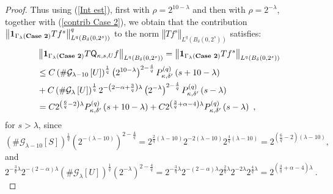 \documentclass{amsart}%
\theoremstyle{plain}
\numberwithin{equation}{section}
\begin{document}
\begin{proof}
Thus using (\ref{Int est}), first with $\rho=2^{10-\lambda}$ and then with
$\rho=2^{-\lambda}$, together with (\ref{contrib Case 2}), we obtain that the
contribution $\left\Vert \mathbf{1}_{\Gamma_{\lambda}\left(
\text{\textbf{Case 2}}\right)  }Tf^{s}\right\Vert _{L^{q}\left(  B_{\delta
}\left(  0,2^{s}\right)  \right)  }^{q}$ to the norm $\left\Vert
Tf^{s}\right\Vert _{L^{q}\left(  B_{\delta}\left(  0,2^{s}\right)  \right)  }$
satisfies:
\begin{align}
&  \left\Vert \mathbf{1}_{\Gamma_{\lambda}\left(  \text{\textbf{Case 2}%
}\right)  }T\mathsf{Q}_{\kappa,s,U}f\right\Vert _{L^{q}\left(  B_{\delta
}\left(  0,2^{s}\right)  \right)  }=\left\Vert \mathbf{1}_{\Gamma_{\lambda
}\left(  \text{\textbf{Case 2}}\right)  }Tf^{s}\right\Vert _{L^{q}\left(
B_{\delta}\left(  0,2^{s}\right)  \right)  }\label{case 2 est}\\
&  \leq C\left(  \#\mathcal{G}_{\lambda-10}\left[  U\right]  \right)
^{\frac{1}{q}}\left(  2^{10-\lambda}\right)  ^{2-\frac{4}{q}}P_{\kappa
,\delta^{\prime}}^{\left(  q\right)  }\left(  s+10-\lambda\right) \nonumber\\
&  +C\left(  \#\mathcal{G}_{\lambda}\left[  U\right]  \right)  ^{\frac{1}{q}%
}2^{-\left(  2-\alpha+\frac{3}{q}\right)  \lambda}\left(  2^{-\lambda}\right)
^{2-\frac{4}{q}}P_{\kappa,\delta^{\prime}}^{\left(  q\right)  }\left(
s-\lambda\right) \nonumber\\
&  =C2^{\left(  \frac{6}{q}-2\right)  \lambda}P_{\kappa,\delta^{\prime}%
}^{\left(  q\right)  }\left(  s+10-\lambda\right)  +C2^{\left(  \frac{3}%
{q}+\alpha-4\right)  \lambda}P_{\kappa,\delta^{\prime}}^{\left(  q\right)
}\left(  s-\lambda\right)  \ ,\nonumber
\end{align}
for $s>\lambda$, since%
\[
\left(  \#\mathcal{G}_{\lambda-10}\left[  S\right]  \right)  ^{\frac{1}{q}%
}\left(  2^{-\left(  \lambda-10\right)  }\right)  ^{2-\frac{4}{q}}=2^{\frac
{2}{q}\left(  \lambda-10\right)  }2^{-2\left(  \lambda-10\right)  }2^{\frac
{4}{q}\left(  \lambda-10\right)  }=2^{\left(  \frac{6}{q}-2\right)  \left(
\lambda-10\right)  },
\]
and%
\[
2^{-\frac{3}{q}\lambda}2^{-\left(  2-\alpha\right)  \lambda}\left(
\#\mathcal{G}_{\lambda}\left[  U\right]  \right)  ^{\frac{1}{q}}\left(
2^{-\lambda}\right)  ^{2-\frac{4}{q}}=2^{-\frac{3}{q}\lambda}2^{-\left(
2-\alpha\right)  \lambda}2^{\frac{2}{q}\lambda}2^{-2\lambda}2^{\frac{4}%
{q}\lambda}=2^{\left(  \frac{3}{q}+\alpha-4\right)  \lambda}\ .
\]

\end{proof}
\end{document}
